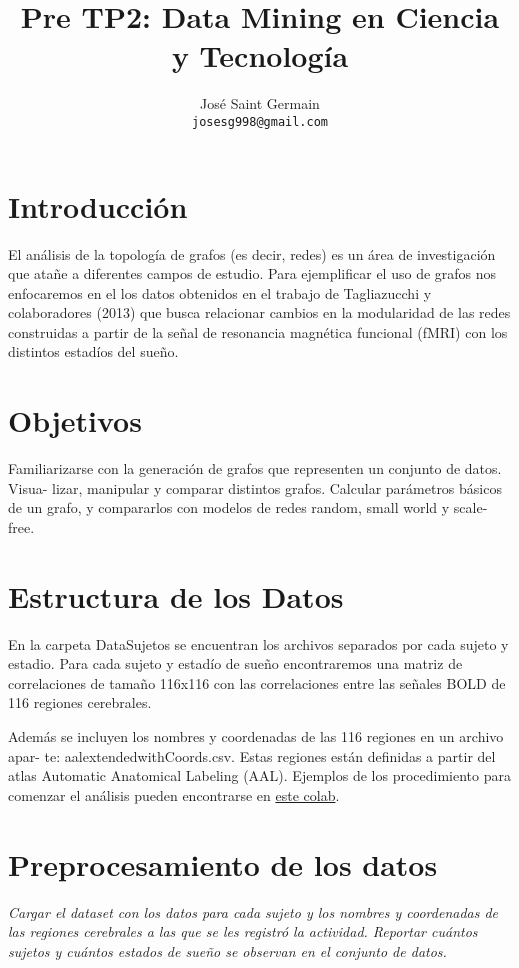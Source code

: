 \documentclass{article}
\title{Pre TP2: Data Mining en Ciencia y Tecnología}
\author{%
  José Saint Germain\\
  \texttt{josesg998@gmail.com} \\
}
\begin{document}
\maketitle

\section{Introducción}

El análisis de la topología de grafos (es decir, redes) es un área de investigación que
atañe a diferentes campos de estudio. Para ejempliﬁcar el uso de grafos nos enfocaremos en
el los datos obtenidos en el trabajo de Tagliazucchi y colaboradores (2013) que busca 
relacionar cambios en la modularidad de las redes construidas a partir de la señal de resonancia
magnética funcional (fMRI) con los distintos estadíos del sueño.
\section{Objetivos}
Familiarizarse con la generación de grafos que representen un conjunto de datos. Visua-
lizar, manipular y comparar distintos grafos. Calcular parámetros básicos de un grafo, y
compararlos con modelos de redes random, small world y scale-free.

\section{Estructura de los Datos}
En la carpeta DataSujetos se encuentran los archivos separados por cada sujeto y estadio. 
Para cada sujeto y estadío de sueño encontraremos una matriz de correlaciones de tamaño
116x116 con las correlaciones entre las señales BOLD de 116 regiones cerebrales.

Además se incluyen los nombres y coordenadas de las 116 regiones en un archivo apar-
te: aalextendedwithCoords.csv. Estas regiones están deﬁnidas a partir del atlas Automatic
Anatomical Labeling (AAL). Ejemplos de los procedimiento para comenzar el análisis pueden 
encontrarse en \href{https://colab.research.google.com/drive/1xU8p_YSeSxPAODgiyJwJAVuuDC-jrTwP#scrollTo=VG4joS9_OZCA#offline=true&sandboxMode=true}{este colab}.

\section{Preprocesamiento de los datos}

\textit{Cargar el dataset con los datos para cada sujeto y los nombres y coordenadas 
de las regiones cerebrales a las que se les registró la actividad. Reportar cuántos sujetos y cuántos estados de sueño se observan en el conjunto de
datos.}
\end{document}
